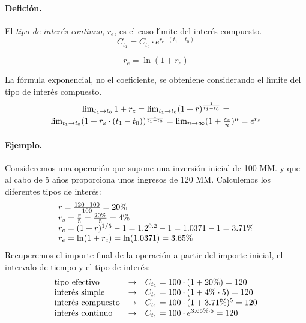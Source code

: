 \paragraph{Defici\'on.}
El \emph{tipo de inter\'es continuo}, $r_e$, es el caso
l\'\i mite del inter\'es compuesto.
\begin{equation}
C_{t_1} = C_{t_0} \cdot e^{r_e \cdot (t_1-t_0)}
\end{equation}

\begin{equation}
\label{interes_continuo_1}
r_e = \ln(1 + r_c)
\end{equation}

La f\'ormula exponencial, no el coeficiente, se obteniene considerando el
l\'\i mite del tipo de inter\'es compuesto.
\begin{equation}
\label{interes_continuo_2}
\begin{array}{c}
\lim_{t_1 \rightarrow t_0} 1+r_c = 
\lim_{t_1 \rightarrow t_0} (1 + r)^{\frac{1}{t_1 - t_0}} = \cr
\lim_{t_1 \rightarrow t_0} (1 + r_s \cdot (t_1-t_0)) ^ {\frac{1}{t_1 - t_0}} =
\lim_{n \rightarrow \infty} (1 + \frac{r_s}{n}) ^ {n} = 
e^{r_s}
\end{array}
\end{equation}

\paragraph{Ejemplo.}
Consideremos una operaci\'on que supone una inversi\'on inicial de 100 MM. y que 
al cabo de 5 a\~{n}os proporciona unos ingresos de 120 MM. 
\newline
\newline
Calculemos los diferentes tipos de inter\'es:
\begin{displaymath}
\begin{array}{l}
r = \frac{120-100}{100} = 20 \% \cr
r_s= \frac{r}{5} = \frac{20 \%}{5} = 4 \% \cr
r_c= (1+r) ^ {1/5} - 1 = 1.2^{0.2} - 1 = 1.0371 - 1 = 3.71 \% \cr
r_e= \ln(1 + r_c) = \ln(1.0371) = 3.65 \%
\end{array}
\end{displaymath}
\newline
\newline
Recuperemos el importe final de la operaci\'on a partir del importe inicial, 
el intervalo de tiempo y el tipo de inter\'es:
\begin{displaymath}
\begin{array}{lcl}
\textrm{tipo efectivo}       & \rightarrow & C_{t_1} = 100 \cdot (1 + 20\%) = 120 \cr
\textrm{inter\'es simple}    & \rightarrow & C_{t_1} = 100 \cdot (1 + 4\% \cdot 5) = 120 \cr
\textrm{inter\'es compuesto} & \rightarrow & C_{t_1} = 100 \cdot (1 + 3.71\%)^5 = 120 \cr
\textrm{inter\'es continuo}  & \rightarrow & C_{t_1} = 100 \cdot e^{3.65 \% \cdot 5} = 120
\end{array}
\end{displaymath}

